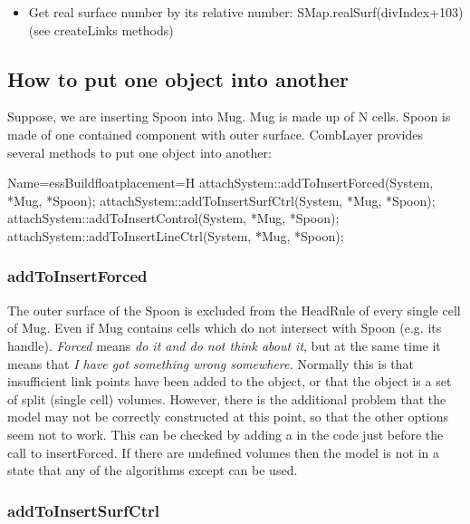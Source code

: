 \begin{itemize}
\item Get real surface number by its relative number: SMap.realSurf(divIndex+103) (see createLinks methods)
\end{itemize}

\subsection{How to put one object into another}

Suppose, we are inserting Spoon into Mug.
Mug is made up of N cells. Spoon is made of one contained component with outer surface.
CombLayer provides several methods to put one object into another:

\begin{cpp}{Name=essBuild}{floatplacement=H}
attachSystem::addToInsertForced(System,   *Mug, *Spoon);
attachSystem::addToInsertSurfCtrl(System, *Mug, *Spoon);
attachSystem::addToInsertControl(System,  *Mug, *Spoon);
attachSystem::addToInsertLineCtrl(System, *Mug, *Spoon);
\end{cpp}

\subsubsection{addToInsertForced}

The outer surface of the Spoon is excluded from the HeadRule of every single cell of Mug.
Even if Mug contains cells which do not intersect with Spoon (e.g. its handle).
{\it Forced} means {\it do it and do not think about it}, but at the same time it means that
{\it I have got something wrong somewhere.}  Normally this is that insufficient link points have been added
to the object, or that the object is a set of split (single cell) volumes.  However, there is the additional
problem that the model may not be correctly constructed at this point, so that the other options seem not to work.
This can be checked by adding a
in the code just before the call to insertForced. If there are undefined volumes then the model is not in a state that
any of the  algorithms except  can be used. 


\subsubsection{addToInsertSurfCtrl}

